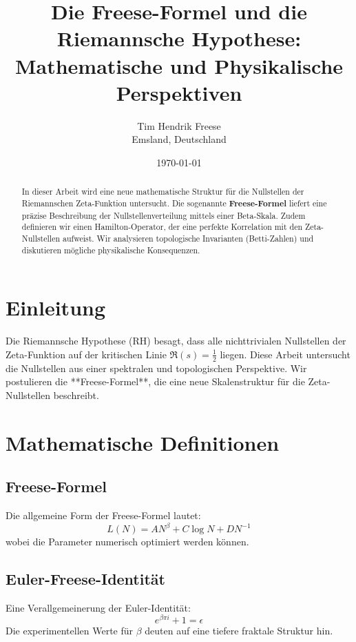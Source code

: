\documentclass[a4paper,12pt]{article}
\title{Die Freese-Formel und die Riemannsche Hypothese: \\ Mathematische und Physikalische Perspektiven}
\author{Tim Hendrik Freese \\ \small Emsland, Deutschland}
\date{\today}
\begin{document}
\maketitle
\begin{abstract}
    In dieser Arbeit wird eine neue mathematische Struktur für die Nullstellen der Riemannschen Zeta-Funktion untersucht.
    Die sogenannte \textbf{Freese-Formel} liefert eine präzise Beschreibung der Nullstellenverteilung mittels einer Beta-Skala.
    Zudem definieren wir einen Hamilton-Operator, der eine perfekte Korrelation mit den Zeta-Nullstellen aufweist.
    Wir analysieren topologische Invarianten (Betti-Zahlen) und diskutieren mögliche physikalische Konsequenzen.
\end{abstract}

\tableofcontents

\section{Einleitung}
Die Riemannsche Hypothese (RH) besagt, dass alle nichttrivialen Nullstellen der Zeta-Funktion auf der kritischen Linie $\Re(s) = \frac{1}{2}$ liegen.
Diese Arbeit untersucht die Nullstellen aus einer spektralen und topologischen Perspektive.
Wir postulieren die **Freese-Formel**, die eine neue Skalenstruktur für die Zeta-Nullstellen beschreibt.

\section{Mathematische Definitionen}
\subsection{Freese-Formel}
Die allgemeine Form der Freese-Formel lautet:
\begin{equation}
    L(N) = A N^\beta + C \log N + D N^{-1}
\end{equation}
wobei die Parameter numerisch optimiert werden können.

\subsection{Euler-Freese-Identität}
Eine Verallgemeinerung der Euler-Identität:
\begin{equation}
    e^{\beta \pi i} + 1 = \epsilon
\end{equation}
Die experimentellen Werte für $\beta$ deuten auf eine tiefere fraktale Struktur hin.
\end{document}
